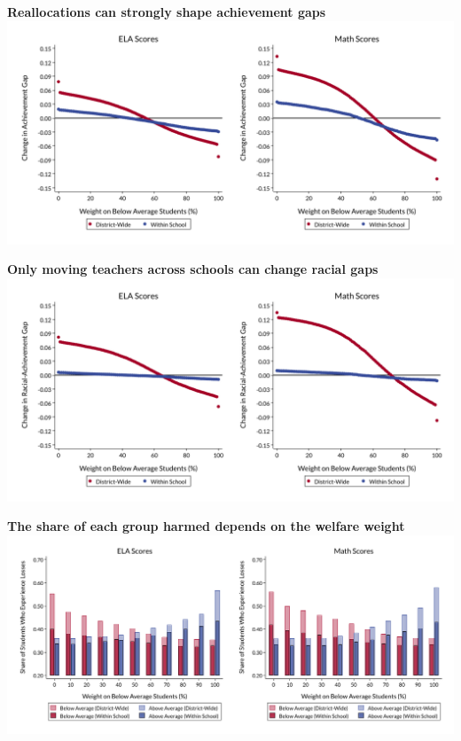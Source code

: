 \documentclass[t,aspectratio=169,11pt,presentation]{beamer}
\begin{document}
\begin{frame}[c,label=achgap]{\textbf{Reallocations can strongly shape achievement gaps}}
\centering
 \includegraphics[width=.95\textwidth]{Working_Slides/WS_Figures/04a_gaps.pdf}
 \raggedright
 \vfill
 \hyperlink{equity3}{}
\end{frame}

\begin{frame}[c,label=urmgap]{\textbf{Only moving teachers across schools can change racial gaps}}
\centering
 \includegraphics[width=.95\textwidth]{Working_Slides/WS_Figures/04b_gaps.pdf}

 \raggedright
 \vfill
 \hyperlink{equity3}{}
\end{frame}


\begin{frame}[c,label=loser]{\textbf{The share of each group harmed depends on the welfare weight}}
\centering
 \includegraphics[width=.95\textwidth]{Working_Slides/WS_Figures/04c_winlose.pdf}

 \raggedright
 \vfill
 \hyperlink{equity3}{}
\end{frame}
\end{document}
